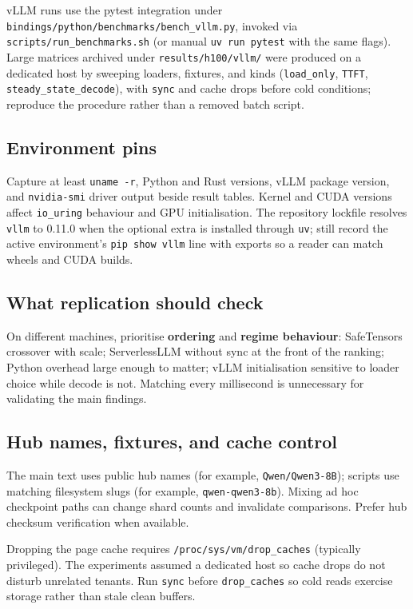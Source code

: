 vLLM runs use the pytest integration under \texttt{bindings/python/benchmarks/bench\_vllm.py}, invoked via \texttt{scripts/run\_benchmarks.sh} (or manual \texttt{uv run pytest} with the same flags). Large matrices archived under \texttt{results/h100/vllm/} were produced on a dedicated host by sweeping loaders, fixtures, and kinds (\texttt{load\_only}, \texttt{TTFT}, \texttt{steady\_state\_decode}), with \texttt{sync} and cache drops before cold conditions; reproduce the procedure rather than a removed batch script.

\subsection{Environment pins}

Capture at least \texttt{uname -r}, Python and Rust versions, vLLM package version, and \texttt{nvidia-smi} driver output beside result tables. Kernel and CUDA versions affect \texttt{io\_uring} behaviour and GPU initialisation. The repository lockfile resolves \texttt{vllm} to 0.11.0 when the optional extra is installed through \texttt{uv}; still record the active environment's \texttt{pip show vllm} line with exports so a reader can match wheels and CUDA builds.

\subsection{What replication should check}

On different machines, prioritise \textbf{ordering} and \textbf{regime behaviour}: SafeTensors crossover with scale; ServerlessLLM without sync at the front of the ranking; Python overhead large enough to matter; vLLM initialisation sensitive to loader choice while decode is not. Matching every millisecond is unnecessary for validating the main findings.

\subsection{Hub names, fixtures, and cache control}

The main text uses public hub names (for example, \texttt{Qwen/Qwen3-8B}); scripts use matching filesystem slugs (for example, \texttt{qwen-qwen3-8b}). Mixing ad hoc checkpoint paths can change shard counts and invalidate comparisons. Prefer hub checksum verification when available.

Dropping the page cache requires \texttt{/proc/sys/vm/drop\_caches} (typically privileged). The experiments assumed a dedicated host so cache drops do not disturb unrelated tenants. Run \texttt{sync} before \texttt{drop\_caches} so cold reads exercise storage rather than stale clean buffers.

